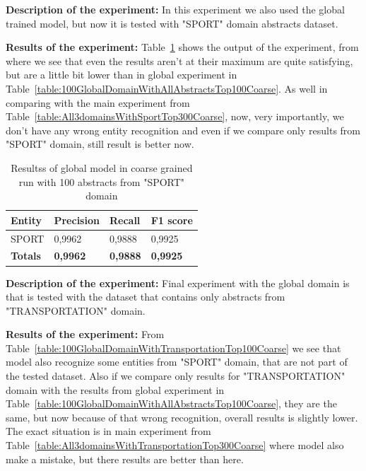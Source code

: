 \documentclass[thesis=M,english]{FITthesis}[2018/05/30]
\begin{document}
	\textbf{Description of the experiment:} In this experiment we also used the global trained model, but now it is tested with "SPORT" domain abstracts dataset.

	\textbf{Results of the experiment:} Table~\ref{table:100GlobalDomainWithSportTop100Coarse} shows the output of the experiment, from where we see that even the results aren't at their maximum are quite satisfying, but are a little bit lower than in global experiment in Table~\ref{table:100GlobalDomainWithAllAbstractsTop100Coarse}. As well in comparing with the main experiment from Table~\ref{table:All3domainsWithSportTop300Coarse}, now, very importantly, we don't have any wrong entity recognition and even if we compare only results from "SPORT" domain, still result is better now.

	\begin{table}[H]\centering
		\begin{tabular}{|l|l|l|l|}
			\hline {\textbf{Entity}} & {\textbf{Precision}} & {\textbf{Recall}} & {\textbf{F1 score}}\\\hline
				SPORT & 0,9962 & 0,9888 & 0,9925\\\hline
				\textbf{Totals} & \textbf{0,9962} & \textbf{0,9888} & \textbf{0,9925}\\\hline
		\end{tabular}
		\caption{Resultss of global model in coarse grained run with 100 abstracts from "SPORT" domain \label{table:100GlobalDomainWithSportTop100Coarse}}
	\end{table}	


	\textbf{Description of the experiment:} Final experiment with the global domain is that is tested with the dataset that contains only abstracts from "TRANSPORTATION" domain.

	\textbf{Results of the experiment:} From Table~\ref{table:100GlobalDomainWithTransportationTop100Coarse} we see that model also recognize some entities from "SPORT" domain, that are not part of the tested dataset. Also if we compare only results for "TRANSPORTATION" domain with the results from global experiment in Table~\ref{table:100GlobalDomainWithAllAbstractsTop100Coarse}, they are the same, but now because of that wrong recognition, overall results is slightly lower. The exact situation is in main experiment from Table~\ref{table:All3domainsWithTransportationTop300Coarse} where model also make a mistake, but there results are better than here.
\end{document}
